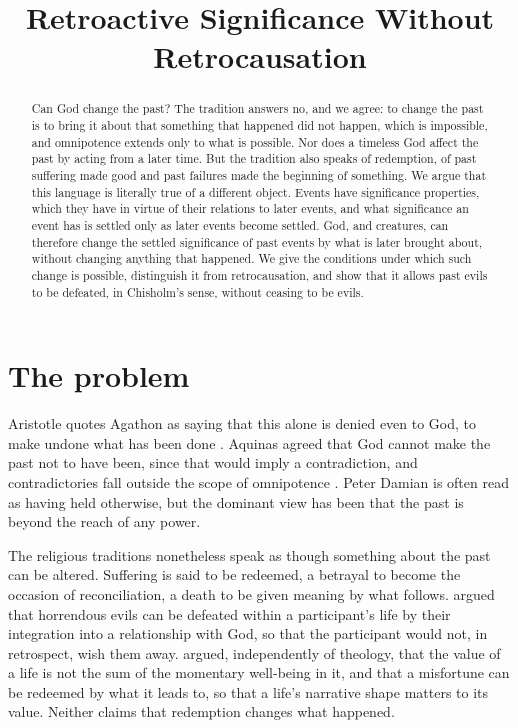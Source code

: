 \documentclass{situationist-preprint}
\title{Retroactive Significance Without Retrocausation}
\begin{document}
\maketitle

\begin{abstract}
Can God change the past? The tradition answers no, and we agree: to change the past is to bring it about that something that happened did not happen, which is impossible, and omnipotence extends only to what is possible. Nor does a timeless God affect the past by acting from a later time. But the tradition also speaks of redemption, of past suffering made good and past failures made the beginning of something. We argue that this language is literally true of a different object. Events have significance properties, which they have in virtue of their relations to later events, and what significance an event has is settled only as later events become settled. God, and creatures, can therefore change the settled significance of past events by what is later brought about, without changing anything that happened. We give the conditions under which such change is possible, distinguish it from retrocausation, and show that it allows past evils to be defeated, in Chisholm's sense, without ceasing to be evils.
\end{abstract}

\section{The problem}

Aristotle quotes Agathon as saying that this alone is denied even to God, to make undone what has been done \citep[VI.2, 1139b]{AristotleNE}. Aquinas agreed that God cannot make the past not to have been, since that would imply a contradiction, and contradictories fall outside the scope of omnipotence \citep[I, q.~25, a.~4]{AquinasST}. Peter Damian is often read as having held otherwise, but the dominant view has been that the past is beyond the reach of any power.

The religious traditions nonetheless speak as though something about the past can be altered. Suffering is said to be redeemed, a betrayal to become the occasion of reconciliation, a death to be given meaning by what follows. \citet{Adams1999} argued that horrendous evils can be defeated within a participant's life by their integration into a relationship with God, so that the participant would not, in retrospect, wish them away. \citet{Velleman1991} argued, independently of theology, that the value of a life is not the sum of the momentary well-being in it, and that a misfortune can be redeemed by what it leads to, so that a life's narrative shape matters to its value. Neither claims that redemption changes what happened.
\end{document}
